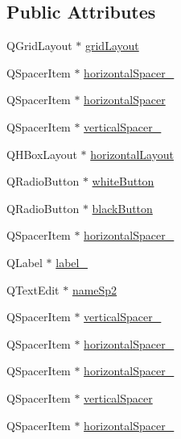 \subsection*{Public Attributes}
\begin{DoxyCompactItemize}
\item 
Q\-Grid\-Layout $\ast$ \hyperlink{classUi__newGame_af00c7fbe40d246c0a12423ff6639ce98}{grid\-Layout}
\item 
Q\-Spacer\-Item $\ast$ \hyperlink{classUi__newGame_a0c35a195fc9503f06f118b71f68831cf}{horizontal\-Spacer\-\_}
\item 
Q\-Spacer\-Item $\ast$ \hyperlink{classUi__newGame_ae7dea93fd489e1f7e266a4a68175e8e2}{horizontal\-Spacer}
\item 
Q\-Spacer\-Item $\ast$ \hyperlink{classUi__newGame_ab395ed91ecc00e33014c9d55c610e450}{vertical\-Spacer\-\_}
\item 
Q\-H\-Box\-Layout $\ast$ \hyperlink{classUi__newGame_a6be218dc85507a03922230cf7571ce67}{horizontal\-Layout}
\item 
Q\-Radio\-Button $\ast$ \hyperlink{classUi__newGame_ae37b86898ab8dc3227368498fb85beb9}{white\-Button}
\item 
Q\-Radio\-Button $\ast$ \hyperlink{classUi__newGame_aacee1777de6ba2eca962668346f66380}{black\-Button}
\item 
Q\-Spacer\-Item $\ast$ \hyperlink{classUi__newGame_a597ec7963aa74eee2c0230a61ff4d06c}{horizontal\-Spacer\-\_}
\item 
Q\-Label $\ast$ \hyperlink{classUi__newGame_ac45543ecb6e7c3fb0d630608ee3dac22}{label\-\_}
\item 
Q\-Text\-Edit $\ast$ \hyperlink{classUi__newGame_a8660b2a66fdf8add501763d794476860}{name\-Sp2}
\item 
Q\-Spacer\-Item $\ast$ \hyperlink{classUi__newGame_abd5d589a7259b90424424545d3bfb308}{vertical\-Spacer\-\_}
\item 
Q\-Spacer\-Item $\ast$ \hyperlink{classUi__newGame_a80a553304075ff540fb89105fdbac0de}{horizontal\-Spacer\-\_}
\item 
Q\-Spacer\-Item $\ast$ \hyperlink{classUi__newGame_a26a2936a291ca49003e2b8eead87d7c6}{horizontal\-Spacer\-\_}
\item 
Q\-Spacer\-Item $\ast$ \hyperlink{classUi__newGame_a5925efee291b9b32995333af735007f4}{vertical\-Spacer}
\item 
Q\-Spacer\-Item $\ast$ \hyperlink{classUi__newGame_a06ede1551bdc4c487207c8fff9443d25}{horizontal\-Spacer\-\_}
\item 

\end{DoxyCompactItemize}
